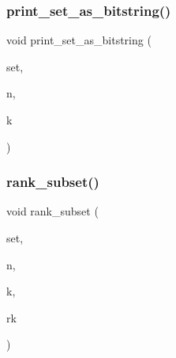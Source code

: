 \mbox{\label{test2_8_c_a0adced9f033d150a230473be7db95be3}} 
\subsubsection{\texorpdfstring{print\+\_\+set\+\_\+as\+\_\+bitstring()}{print\_set\_as\_bitstring()}}
{\footnotesize\ttfamily void print\+\_\+set\+\_\+as\+\_\+bitstring (\begin{DoxyParamCaption}\item[{\mbox{\hyperlink{galois_8h_a09fddde158a3a20bd2dcadb609de11dc}{I\+NT}} $\ast$}]{set,  }\item[{\mbox{\hyperlink{galois_8h_a09fddde158a3a20bd2dcadb609de11dc}{I\+NT}}}]{n,  }\item[{\mbox{\hyperlink{galois_8h_a09fddde158a3a20bd2dcadb609de11dc}{I\+NT}}}]{k }\end{DoxyParamCaption})}

\mbox{\label{test2_8_c_abf5de6698fa2a247092d09eb65dbec60}} 
\subsubsection{\texorpdfstring{rank\+\_\+subset()}{rank\_subset()}}
{\footnotesize\ttfamily void rank\+\_\+subset (\begin{DoxyParamCaption}\item[{\mbox{\hyperlink{galois_8h_a09fddde158a3a20bd2dcadb609de11dc}{I\+NT}} $\ast$}]{set,  }\item[{\mbox{\hyperlink{galois_8h_a09fddde158a3a20bd2dcadb609de11dc}{I\+NT}}}]{n,  }\item[{\mbox{\hyperlink{galois_8h_a09fddde158a3a20bd2dcadb609de11dc}{I\+NT}}}]{k,  }\item[{\mbox{\hyperlink{classlonginteger__object}{longinteger\+\_\+object}} \&}]{rk }\end{DoxyParamCaption})}

\mbox{\label{test2_8_c_a6ec685ea3246d8d770c8896185687aee}} 
